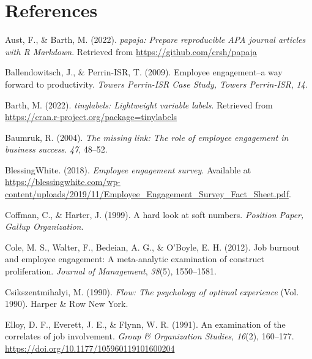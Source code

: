 \documentclass[
  man]{apa6}
\newlength{\cslhangindent}
\newlength{\cslentryspacingunit} %
\newenvironment{CSLReferences}[2] %
 {%
  \setlength{\parindent}{0pt}
  \ifodd #1
  \let\oldpar\par
  \def\par{\hangindent=\cslhangindent\oldpar}
  \fi
  \setlength{\parskip}{#2\cslentryspacingunit}
 }%
 {}
\begin{document}
\hypertarget{references}{%
\section{References}\label{references}}

\hypertarget{refs}{}
\begin{CSLReferences}{1}{0}
\leavevmode{}%
Aust, F., \& Barth, M. (2022). \emph{{papaja}: {Prepare} reproducible {APA} journal articles with {R Markdown}}. Retrieved from \url{https://github.com/crsh/papaja}

\leavevmode{}%
Ballendowitsch, J., \& Perrin-ISR, T. (2009). Employee engagement--a way forward to productivity. \emph{Towers Perrin-ISR Case Study, Towers Perrin-ISR}, \emph{14}.

\leavevmode{}%
Barth, M. (2022). \emph{{tinylabels}: Lightweight variable labels}. Retrieved from \url{https://cran.r-project.org/package=tinylabels}

\leavevmode{}%
Baumruk, R. (2004). \emph{The missing link: The role of employee engagement in business success}. \emph{47}, 48--52.

\leavevmode{}%
BlessingWhite. (2018). \emph{Employee engagement survey}. Available at \url{https://blessingwhite.com/wp-content/uploads/2019/11/Employee_Engagement_Survey_Fact_Sheet.pdf}.

\leavevmode{}%
Coffman, C., \& Harter, J. (1999). A hard look at soft numbers. \emph{Position Paper, Gallup Organization}.

\leavevmode{}%
Cole, M. S., Walter, F., Bedeian, A. G., \& O'Boyle, E. H. (2012). Job burnout and employee engagement: A meta-analytic examination of construct proliferation. \emph{Journal of Management}, \emph{38}(5), 1550--1581.

\leavevmode{}%
Csikszentmihalyi, M. (1990). \emph{Flow: The psychology of optimal experience} (Vol. 1990). Harper \& Row New York.

\leavevmode{}%
Elloy, D. F., Everett, J. E., \& Flynn, W. R. (1991). An examination of the correlates of job involvement. \emph{Group \& Organization Studies}, \emph{16}(2), 160--177. \url{https://doi.org/10.1177/105960119101600204}


\end{CSLReferences}
\end{document}

